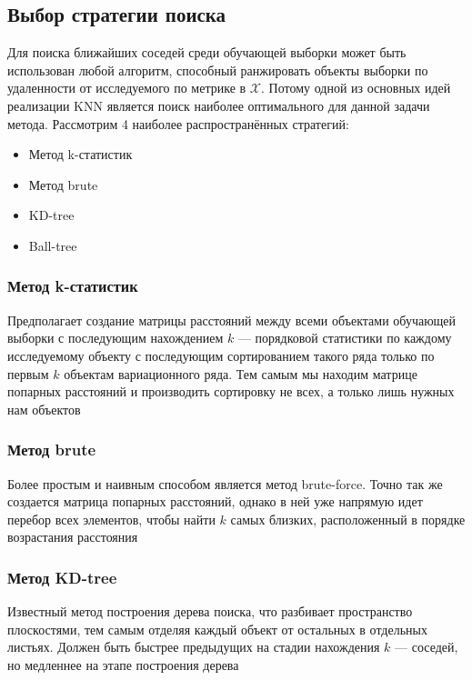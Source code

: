 \documentclass{article}
\begin{document}
    \subsection{Выбор стратегии поиска}
        Для поиска ближайших соседей среди обучающей выборки может быть использован любой алгоритм, способный ранжировать объекты выборки по удаленности от исследуемого по метрике в $\mathcal{X}$. Потому одной из основных идей реализации KNN является поиск наиболее оптимального для данной задачи метода. Рассмотрим 4 наиболее распространённых стратегий:
        \begin{itemize}
            \item Метод k-статистик
            \item Метод brute
            \item KD-tree
            \item Ball-tree
        \end{itemize}

        \subsubsection{Метод k-статистик}
            Предполагает создание матрицы расстояний между всеми объектами обучающей выборки с последующим нахождением $k$ — порядковой статистики по каждому исследуемому объекту с последующим сортированием такого ряда только по первым $k$ объектам вариационного ряда. Тем самым мы находим матрице попарных расстояний и производить сортировку не всех, а только лишь нужных нам объектов

        \subsubsection{Метод brute}
            Более простым и наивным способом является метод brute-force. Точно так же создается матрица попарных расстояний, однако в ней уже напрямую идет перебор всех элементов, чтобы найти $k$ самых близких, расположенный в порядке возрастания расстояния

        \subsubsection{Метод KD-tree}
            Известный метод построения дерева поиска, что разбивает пространство плоскостями, тем самым отделяя каждый объект от остальных в отдельных листьях. Должен быть быстрее предыдущих на стадии нахождения $k$ — соседей, но медленнее на этапе построения дерева
\end{document}
